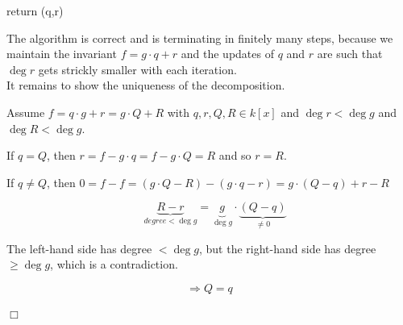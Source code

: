 \begin{proposition}[title = Proposition 1.5.2]
\begin{algorithm}[title = Univariate Division Algorithm]
\begin{lstpseudo}
return (q,r)
\end{lstpseudo}
    \end{algorithm}

    The algorithm is correct and is terminating in finitely many steps, because we maintain the invariant $f = g \cdot q + r$ and the updates of $q$ and  $r$ are such 
    that $\deg r$ gets strickly smaller with each iteration. \\

    It remains to show the uniqueness of the decomposition. 

    Assume $f = q \cdot g+r = g \cdot Q + R$ with $q,r,Q,R \in k[x]$ and $\deg r < \deg g$ and $\deg R < \deg g$. 
    
    If $q = Q$, then $r = f-g \cdot q = f -g \cdot Q = R$ and so $r = R$. 

    If $q \neq Q$, then $0 = f -f = (g \cdot Q - R) - (g \cdot q -r) = g \cdot (Q -q) + r - R$ 

    \[\quad \underbrace{R - r}_{degree < \deg g} = \underbrace{g}_{\deg g} \cdot \underbrace{(Q- q)}_{\neq 0}\]
    
    The left-hand side has degree $< \deg g$, but the right-hand side has degree $\geq \deg g$, which is a contradiction.  

    \[\Longrightarrow Q = q\]
    \begin{flushright}
      $\Box $
    \end{flushright}
\end{proposition}

